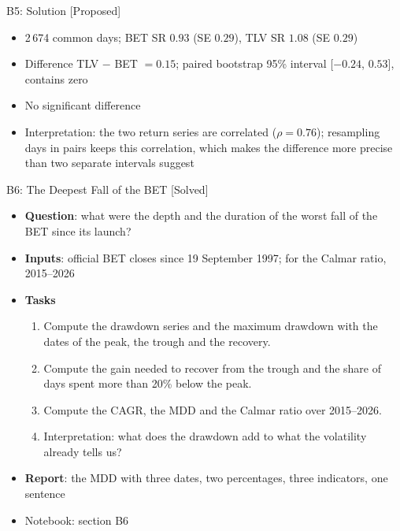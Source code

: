 \ifsolutions
\begin{frame}{B5: Solution [Proposed]}
\itemsize{\footnotesize}
\begin{itemize}
    \item 2\,674 common days; BET SR $0.93$ (SE $0.29$), TLV SR $1.08$ (SE $0.29$)
    \item Difference TLV $-$ BET $= 0.15$; paired bootstrap 95\% interval [$-0.24$, $0.53$], contains zero
    \item No significant difference
    \item Interpretation: the two return series are correlated ($\rho = 0.76$); resampling days in pairs keeps this correlation, which makes the difference more precise than two separate intervals suggest
\end{itemize}
\end{frame}
\fi

\begin{frame}{B6: The Deepest Fall of the BET [Solved]}
\itemsize{\footnotesize}
\begin{itemize}
\item \textbf{Question}: what were the depth and the duration of the worst fall of the BET since its launch?
\item \textbf{Inputs}: official BET closes since 19 September 1997; for the Calmar ratio, 2015--2026
\item \textbf{Tasks}
\begin{enumerate}
    \item Compute the drawdown series and the maximum drawdown with the dates of the peak, the trough and the recovery.
    \item Compute the gain needed to recover from the trough and the share of days spent more than 20\% below the peak.
    \item Compute the CAGR, the MDD and the Calmar ratio over 2015--2026.
    \item Interpretation: what does the drawdown add to what the volatility already tells us?
\end{enumerate}
\item \textbf{Report}: the MDD with three dates, two percentages, three indicators, one sentence
\item Notebook: section B6
\end{itemize}
\end{frame}

